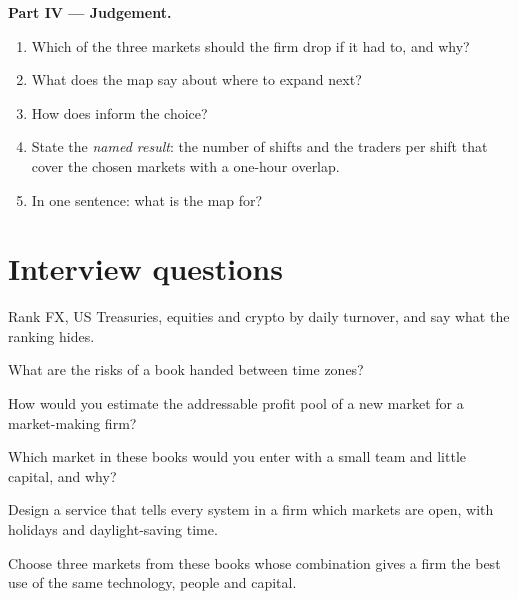 \begin{problem}
\medskip\noindent\textbf{Part IV --- Judgement.}
\begin{enumerate}[resume]
\item Which of the three markets should the firm drop if it had to, and why?
\item What does the map say about where to expand next?
\item How does  inform the choice?
\item State the \emph{named result}: the number of shifts and the traders per shift that cover the chosen markets with a one-hour overlap.
\item In one sentence: what is the map for?
\end{enumerate}
\end{problem}

\section{Interview questions}

\begin{interviewq}\label{iq:m3:a-map-of-all-markets:1}
Rank FX, US Treasuries, equities and crypto by daily turnover, and say what the ranking hides.
\end{interviewq}

\begin{interviewq}\label{iq:m3:a-map-of-all-markets:2}
What are the risks of a book handed between time zones?
\end{interviewq}

\begin{interviewq}\label{iq:m3:a-map-of-all-markets:3}
How would you estimate the addressable profit pool of a new market for a market-making firm?
\end{interviewq}

\begin{interviewq}\label{iq:m3:a-map-of-all-markets:4}
Which market in these books would you enter with a small team and little capital, and why?
\end{interviewq}

\begin{interviewq}\label{iq:m3:a-map-of-all-markets:5}
Design a service that tells every system in a firm which markets are open, with holidays and daylight-saving time.
\end{interviewq}

\begin{interviewq}\label{iq:m3:a-map-of-all-markets:6}
Choose three markets from these books whose combination gives a firm the best use of the same technology, people and capital.
\end{interviewq}
